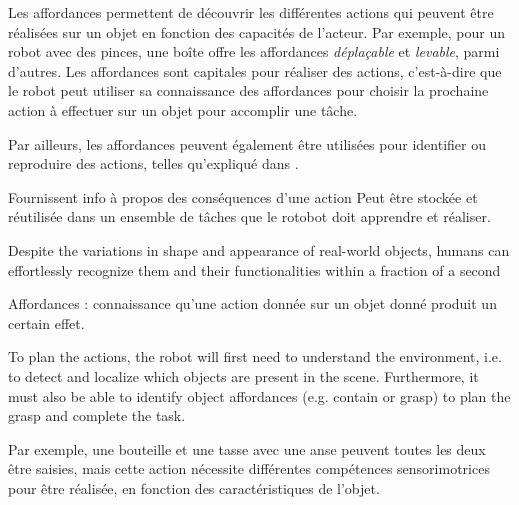 \documentclass[draft]{llncs}
\begin{document}
Les affordances permettent de découvrir les différentes actions qui peuvent être réalisées sur un objet en fonction des capacités de l'acteur.
Par exemple, pour un robot avec des pinces, une boîte offre les affordances \textit{déplaçable} et \textit{levable}, parmi d'autres.
Les affordances sont capitales pour réaliser des actions, c'est-à-dire que le robot peut utiliser sa connaissance des affordances pour choisir la prochaine action à effectuer sur un objet pour accomplir une tâche.

Par ailleurs, les affordances peuvent également être utilisées pour identifier ou reproduire des actions, telles qu'expliqué dans \cite{4399517}.



Fournissent info à propos des conséquences d'une action
Peut être stockée et réutilisée dans un ensemble de tâches que le rotobot doit apprendre et réaliser.

Despite the variations in shape and appearance of real-world objects, humans can effortlessly recognize them and their functionalities within a fraction of a second



Affordances : connaissance qu'une action donnée sur un objet donné produit un certain effet.

To plan the actions, the robot will first need to understand the environment, i.e. to detect and localize which objects are present in the scene.
Furthermore, it must also be able to identify object affordances (e.g. contain or grasp) to plan the grasp and complete the task.

Par exemple, une bouteille et une tasse avec une anse peuvent toutes les deux être saisies, mais cette action nécessite différentes compétences sensorimotrices pour être réalisée, en fonction des caractéristiques de l'objet.
\end{document}
